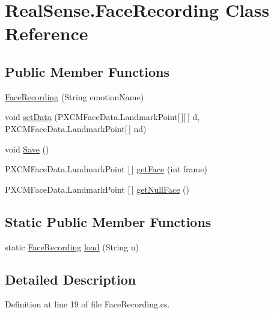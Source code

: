 \hypertarget{class_real_sense_1_1_face_recording}{}\section{Real\+Sense.\+Face\+Recording Class Reference}
\label{class_real_sense_1_1_face_recording}
\subsection*{Public Member Functions}
\begin{DoxyCompactItemize}
\item 
\hyperlink{class_real_sense_1_1_face_recording_a06fe1ad41d77cd359dd583c70d1f6e35}{Face\+Recording} (String emotion\+Name)
\item 
void \hyperlink{class_real_sense_1_1_face_recording_a94e9208ed4f1fe15264ab3b2293f3ce4}{set\+Data} (P\+X\+C\+M\+Face\+Data.\+Landmark\+Point\mbox{[}$\,$\mbox{]}\mbox{[}$\,$\mbox{]} d, P\+X\+C\+M\+Face\+Data.\+Landmark\+Point\mbox{[}$\,$\mbox{]} nd)
\item 
void \hyperlink{class_real_sense_1_1_face_recording_a856729fd53a364765b202b3a9fb6f5dd}{Save} ()
\item 
P\+X\+C\+M\+Face\+Data.\+Landmark\+Point \mbox{[}$\,$\mbox{]} \hyperlink{class_real_sense_1_1_face_recording_a8a5e0b5187f8f71e490c612289df757f}{get\+Face} (int frame)
\item 
P\+X\+C\+M\+Face\+Data.\+Landmark\+Point \mbox{[}$\,$\mbox{]} \hyperlink{class_real_sense_1_1_face_recording_adb306111dec190d5852088978ea2459e}{get\+Null\+Face} ()
\end{DoxyCompactItemize}
\subsection*{Static Public Member Functions}
\begin{DoxyCompactItemize}
\item 
static \hyperlink{class_real_sense_1_1_face_recording}{Face\+Recording} \hyperlink{class_real_sense_1_1_face_recording_a61d844c987701d6a21c0ce83333bdf14}{load} (String n)
\end{DoxyCompactItemize}


\subsection{Detailed Description}


Definition at line 19 of file Face\+Recording.\+cs.



